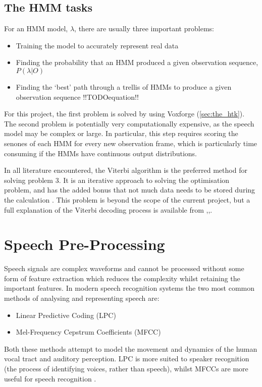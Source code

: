 	\subsection{The HMM tasks} %
	\label{sub:viterbi_decoding}
		For an HMM model, $\lambda$, there are usually three important problems: 
		\begin{itemize}
			\item Training the model to accurately represent real data
			\item Finding the probability that an HMM produced a given observation sequence, $P(\lambda | O)$
			\item Finding the `best' path through a trellis of HMMs to produce a given observation sequence !!TODOequation!!
		\end{itemize}
		For this project, the first problem is solved by using Voxforge (\ref{sec:the_htk}).  The second problem is potentially very computationally expensive, as the speech model may be complex or large.  In particular, this step requires scoring the senones of each HMM for every new observation frame, which is particularly time consuming if the HMMs have continuous output distributions.

		In all literature encountered, the Viterbi algorithm is the preferred method for solving problem 3.  It is an iterative approach to solving the optimisation problem, and has the added bonus that not much data needs to be stored during the calculation \cite{schuster2006speech}.  This problem is beyond the scope of the current project, but a full explanation of the Viterbi decoding process is available from \cite{rabiner1989tutorial},\cite{melnikoff2003speech},\cite{saeed2008advanced}.


\section{Speech Pre-Processing} %
\label{sec:speech_pre_processing}
	Speech signals are complex waveforms and cannot be processed without some form of feature extraction which reduces the complexity whilst retaining the important features.  In modern speech recognition systems the two most common methods of analysing and representing speech are: \cite{gaikwad2010review}
	\begin{itemize}
		\item Linear Predictive Coding (LPC)
		\item Mel-Frequency Cepstrum Coefficients (MFCC)
	\end{itemize}
	Both these methods attempt to model the movement and dynamics of the human vocal tract and auditory perception.  LPC is more suited to speaker recognition (the process of identifying voices, rather than speech), whilst MFCCs are more useful for speech recognition \cite{sd2012interview}.

